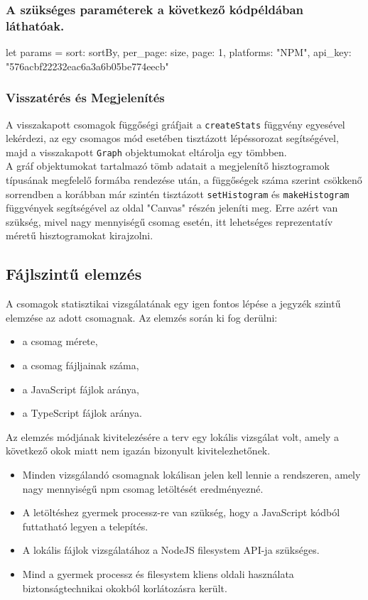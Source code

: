 \subsubsection{A szükséges paraméterek a következő kódpéldában láthatóak.}
\begin{js}
let params = {
  sort: sortBy, 
  per_page: size,
  page: 1,
  platforms: "NPM",
  api_key: "576acbf22232eac6a3a6b05be774eecb"
}
\end{js}

\subsubsection{Visszatérés és Megjelenítés}

A visszakapott csomagok függőségi gráfjait a \texttt{createStats} függvény egyesével lekérdezi, az egy csomagos mód esetében tisztázott lépéssorozat segítségével, majd a visszakapott \texttt{Graph} objektumokat eltárolja egy tömbben.\\

A gráf objektumokat tartalmazó tömb adatait a megjelenítő hisztogramok típusának megfelelő formába rendezése után, a függőségek száma szerint csökkenő sorrendben a korábban már szintén tisztázott \texttt{setHistogram} és \texttt{makeHistogram} függvények segítségével az oldal "Canvas" részén jeleníti meg. Erre azért van szükség, mivel nagy mennyiségű csomag esetén, itt lehetséges reprezentatív méretű hisztogramokat kirajzolni.

\subsection{Fájlszintű elemzés} 
A csomagok statisztikai vizsgálatának egy igen fontos lépése a jegyzék szintű elemzése az adott csomagnak. Az elemzés során ki fog derülni:
\begin{itemize}
	\item a csomag mérete,
	\item a csomag fájljainak száma,
	\item a JavaScript fájlok aránya,
	\item a TypeScript fájlok aránya.
\end{itemize}

\noindent Az elemzés módjának kivitelezésére a terv egy lokális vizsgálat volt, amely a következő okok miatt nem igazán bizonyult kivitelezhetőnek.
\begin{itemize}
	\item Minden vizsgálandó csomagnak lokálisan jelen kell lennie a rendszeren, amely nagy mennyiségű npm csomag letöltését eredményezné.
	\item A letöltéshez gyermek processz-re van szükség, hogy a JavaScript kódból futtatható legyen a telepítés.
	\item A lokális fájlok vizsgálatához a NodeJS filesystem API-ja szükséges.
	\item Mind a gyermek processz és filesystem kliens oldali használata biztonságtechnikai okokból korlátozásra került.
\end{itemize}

